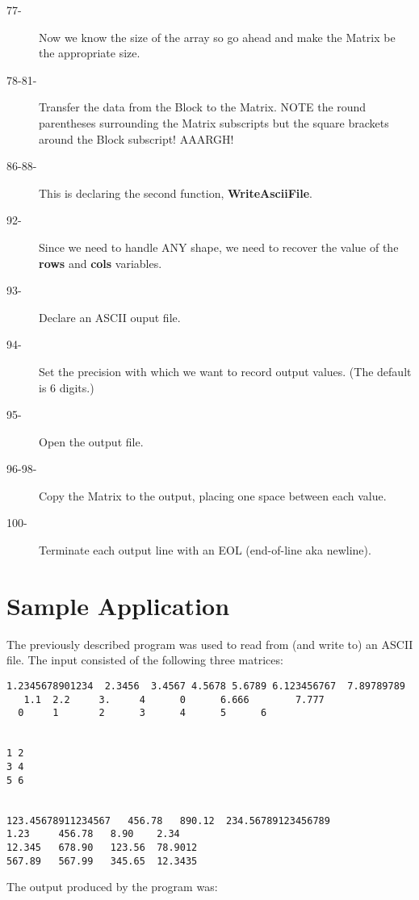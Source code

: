 \begin{description}
\item[77-] Now we know the size of the array so go ahead and make the Matrix be the
appropriate size.

\item[78-81-] Transfer the data from the Block to the Matrix. NOTE the round 
parentheses surrounding the Matrix subscripts but the square brackets around
the Block subscript!  AAARGH!

\item[86-88-] This is declaring the second function, {\bf WriteAsciiFile}.

\item[92-] Since we need to handle ANY shape, we need to recover the value of the
{\bf rows} and {\bf cols} variables.

\item[93-] Declare an ASCII ouput file.

\item[94-] Set the precision with which we want to record output values. (The default
is 6 digits.)

\item[95-] Open the output file.

\item[96-98-] Copy the Matrix to the output, placing one space between each value.

\item[100-] Terminate each output line with an EOL (end-of-line aka newline).
\end{description}

\section{Sample Application}

	The previously described program was used to read from (and write to)
an ASCII file.  The input consisted of the following three matrices:


\begin{verbatim}
1.2345678901234  2.3456  3.4567 4.5678 5.6789 6.123456767  7.89789789
   1.1  2.2     3.     4      0      6.666        7.777       
  0     1       2      3      4      5      6


1 2
3 4
5 6


123.45678911234567   456.78   890.12  234.56789123456789
1.23     456.78   8.90    2.34
12.345   678.90   123.56  78.9012
567.89   567.99   345.65  12.3435
\end{verbatim}

	The output produced by the program was:

